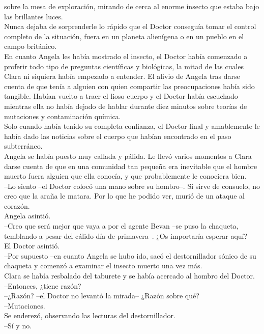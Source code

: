 {sobre la mesa de exploración, mirando de cerca al enorme insecto que
estaba bajo las brillantes luces.\\
Nunca dejaba de sorprenderle lo rápido que el Doctor conseguía tomar el
control completo de la situación, fuera en un planeta alienígena o en un
pueblo en el campo británico.\\
En cuanto Angela les había mostrado el insecto, el Doctor había
comenzado a proferir todo tipo de preguntas científicas y biológicas, la
mitad de las cuales Clara ni siquiera había empezado a entender. El
alivio de Angela tras darse cuenta de que tenía a alguien con quien
compartir las preocupaciones había sido tangible. Habían vuelto a traer
el lioso cuerpo y el Doctor había escuchado mientras ella no había
dejado de hablar durante diez minutos sobre teorías de mutaciones y
contaminación química.\\
Solo cuando había tenido su completa confianza, el Doctor final y
amablemente le había dado las noticias sobre el cuerpo que habían
encontrado en el paso subterráneo.\\
Angela se había puesto muy callada y pálida. Le llevó varios momentos a
Clara darse cuenta de que en una comunidad tan pequeña era inevitable
que el hombre muerto fuera alguien que ella conocía, y que probablemente
le conociera bien.\\
--Lo siento --el Doctor colocó una mano sobre su hombro--. Si sirve de
consuelo, no creo que la araña le matara. Por lo que he podido ver,
murió de un ataque al corazón.\\
Angela asintió.\\
--Creo que será mejor que vaya a por el agente Bevan --se puso la
chaqueta, temblando a pesar del cálido día de primavera--. ¿Os
importaría esperar aquí?\\
El Doctor asintió.\\
--Por supuesto --en cuanto Angela se hubo ido, sacó el destornillador
sónico de su chaqueta y comenzó a examinar el insecto muerto una vez
más.\\
Clara se había resbalado del taburete y se había acercado al hombro del
Doctor.\\
--Entonces, ¿tiene razón?\\
--¿Razón? --el Doctor no levantó la mirada-- ¿Razón sobre qué?\\
--Mutaciones.\\
Se enderezó, observando las lecturas del destornillador.\\
--Sí y no.\\
}
